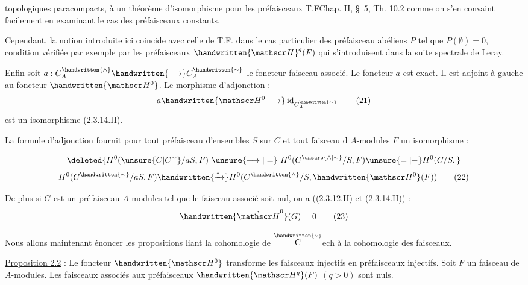 topologiques paracompacts, à un théorème d'isomorphisme pour les  préfaisceaux \handwritten{[}T.F\quad Chap. II, \S~5, Th. 10.2\handwritten{]} comme on s'en convaint facilement en examinant le cas des préfaisceaux constants.

Cependant, la notion introduite ici coincide avec celle de \handwritten{[}T.F.\handwritten{]} dans le cas particulier des préfaisceau abéliens $P$ tel que $P(\emptyset)=0$, condition vérifiée par exemple par les préfaisceaux $\handwritten{\mathscr H}^q(F)$  qui s'introduisent dans la suite spectrale de Leray.

Enfin soit  $a:C_A^{\handwritten{\wedge}}\handwritten{\longrightarrow}C_A^{\handwritten{\sim}}$ le foncteur faisceau associé. Le foncteur $a$ est exact. Il est adjoint à gauche au foncteur $\handwritten{\mathscr H^0}$. Le morphisme d'adjonction :
\[
a\handwritten{\mathscr H^0\longrightarrow}\operatorname{id}_{C_A^{\handwritten{\sim}}}\tag*{(21)}
\]
est un isomorphisme (2.3.14.II).

La formule d'adjonction fournit pour tout préfaisceau d'ensembles $S$ sur $C$ et tout faisceau d $A$-modules $F$ un isomorphisme :

\[
\deleted{H^0(\unsure{C|C^{\sim}}/aS,F)\ \unsure{\longrightarrow|=}\ H^0(C^{\unsure{\wedge|\sim}}/S,F)\unsure{=|-}H^0(C/S,}
\]
\[
H^0(C^{\handwritten{\sim}}/aS,F)\handwritten{\xrightarrow{\sim}}H^0(C^{\handwritten{\wedge}}/S,\handwritten{\mathscr H^0}(F))\tag*{(22)}
\]

De plus si $G$ est un préfaisceau  $A$-modules tel que le faisceau associé soit nul, on a ((2.3.12.II) et (2.3.14.II)) :
\[
\handwritten{\check{\mathscr H}^{0}}(G)=0\tag*{(23)}
\]

Nous allons maintenant énoncer les propositions liant la cohomologie de $\overset{\handwritten{\scriptscriptstyle\vee}}{\text{C}}$ech à la cohomologie des faisceaux.

\uline{Proposition 2.2} : Le foncteur $\handwritten{\mathscr H^0}$ transforme les faisceaux injectifs en préfaisceaux injectifs. Soit $F$ un faisceau de $A$-modules. Les faisceaux associés aux préfaisceaux $\handwritten{\mathscr H^q}(F)$ $(q>0)$ sont nuls.

